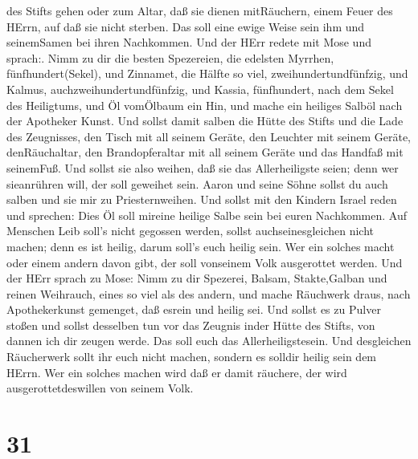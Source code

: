 des Stifts gehen oder zum Altar, daß sie dienen mitRäuchern, einem Feuer
des HErrn,  auf daß sie nicht sterben. Das soll eine ewige
Weise sein ihm und seinemSamen bei ihren Nachkommen.  Und
der HErr redete mit Mose und sprach:.  Nimm zu dir die
besten Spezereien, die edelsten Myrrhen, fünfhundert(Sekel), und
Zinnamet, die Hälfte so viel, zweihundertundfünfzig, und Kalmus,
auchzweihundertundfünfzig,  und Kassia, fünfhundert, nach
dem Sekel des Heiligtums, und Öl vomÖlbaum ein Hin,  und
mache ein heiliges Salböl nach der Apotheker Kunst.  Und
sollst damit salben die Hütte des Stifts und die Lade des Zeugnisses,
 den Tisch mit all seinem Geräte, den Leuchter mit seinem
Geräte, denRäuchaltar,  den Brandopferaltar mit all seinem
Geräte und das Handfaß mit seinemFuß.  Und sollst sie also
weihen, daß sie das Allerheiligste seien; denn wer sieanrühren will, der
soll geweihet sein.  Aaron und seine Söhne sollst du auch
salben und sie mir zu Priesternweihen.  Und sollst mit den
Kindern Israel reden und sprechen: Dies Öl soll mireine heilige Salbe
sein bei euren Nachkommen.  Auf Menschen Leib soll's nicht
gegossen werden, sollst auchseinesgleichen nicht machen; denn es ist
heilig, darum soll's euch heilig sein.  Wer ein solches
macht oder einem andern davon gibt, der soll vonseinem Volk ausgerottet
werden.  Und der HErr sprach zu Mose: Nimm zu dir Spezerei,
Balsam, Stakte,Galban und reinen Weihrauch, eines so viel als des
andern,  und mache Räuchwerk draus, nach Apothekerkunst
gemenget, daß esrein und heilig sei.  Und sollst es zu
Pulver stoßen und sollst desselben tun vor das Zeugnis inder Hütte des
Stifts, von dannen ich dir zeugen werde. Das soll euch das
Allerheiligstesein.  Und desgleichen Räucherwerk sollt ihr
euch nicht machen, sondern es solldir heilig sein dem HErrn.
 Wer ein solches machen wird daß er damit räuchere, der
wird ausgerottetdeswillen von seinem Volk.

\hypertarget{section-30}{%
\section{31}\label{section-30}}

